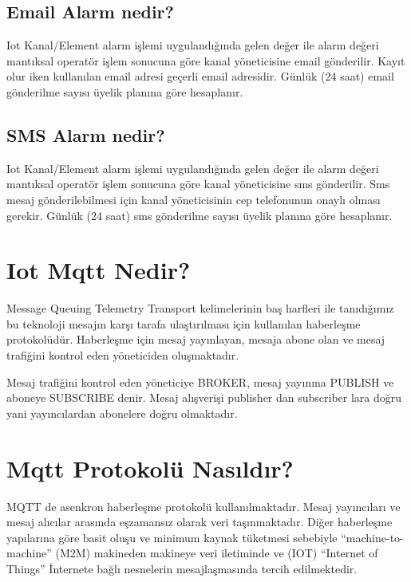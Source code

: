 \documentclass[letterpaper,10pt,turkish]{sphinxmanual}
\begin{document}
\subsection{Email Alarm nedir?}
\label{\detokenize{email-sms-alert:email-alarm-nedir}}
Iot Kanal/Element alarm işlemi uygulandığında gelen değer ile alarm değeri mantıksal operatör işlem sonucuna göre kanal yöneticisine
email gönderilir. Kayıt olur iken kullanılan email adresi geçerli email adresidir. Günlük (24 saat) email gönderilme sayısı
üyelik planına göre hesaplanır.


\subsection{SMS Alarm nedir?}
\label{\detokenize{email-sms-alert:sms-alarm-nedir}}
Iot Kanal/Element alarm işlemi uygulandığında gelen değer ile alarm değeri mantıksal operatör işlem sonucuna göre kanal yöneticisine
sms gönderilir. Sms mesaj gönderilebilmesi için kanal yöneticisinin cep telefonunun onaylı olması gerekir. Günlük (24 saat) sms gönderilme sayısı
üyelik planına göre hesaplanır.


\section{Iot Mqtt Nedir?}
\label{\detokenize{what-is-iot-mqtt:what-is-iot-mqtt}}\label{\detokenize{what-is-iot-mqtt:iot-mqtt-nedir}}\label{\detokenize{what-is-iot-mqtt::doc}}
 Message Queuing Telemetry Transport kelimelerinin baş harfleri ile tanıdığımız bu teknoloji
mesajın karşı tarafa ulaştırılması için kullanılan haberleşme protokolüdür.  Haberleşme için mesaj yayınlayan,
mesaja abone olan ve mesaj trafiğini kontrol eden yöneticiden oluşmaktadır.

Mesaj trafiğini kontrol eden yöneticiye BROKER, mesaj yayınına PUBLISH ve aboneye SUBSCRIBE denir. Mesaj alışverişi
publisher dan subscriber lara doğru yani yayıncılardan abonelere doğru olmaktadır.
\begin{figure}[htbp]
\centering
\capstart

\noindent{}
\caption{}\label{\detokenize{what-is-iot-mqtt:id1}}\end{figure}


\section{Mqtt Protokolü Nasıldır?}
\label{\detokenize{what-is-iot-mqtt:mqtt-protokolu-nasildir}}
MQTT de asenkron haberleşme protokolü kullanılmaktadır. Mesaj yayıncıları ve mesaj alıcılar arasında
eşzamansız olarak veri taşınmaktadır. Diğer haberleşme yapılarına göre basit oluşu ve
minimum kaynak tüketmesi sebebiyle “machine-to-machine” (M2M)  makineden makineye veri
iletiminde ve (IOT) “Internet of Things” İnternete bağlı nesnelerin mesajlaşmasında tercih edilmektedir.
\end{document}
